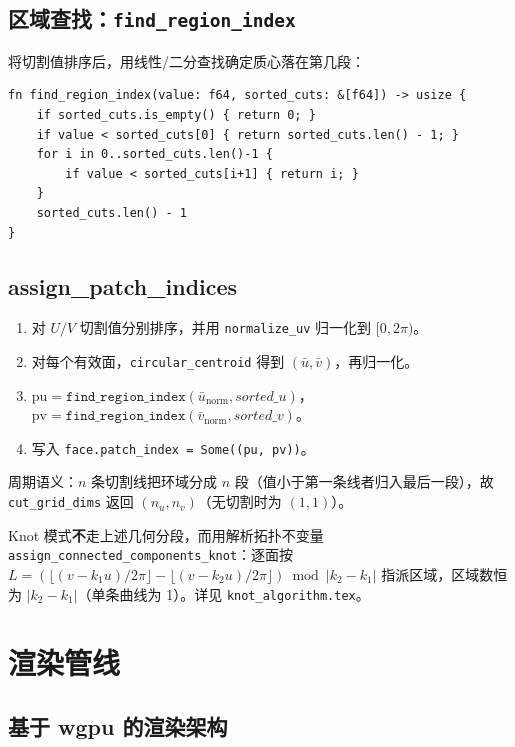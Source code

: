\documentclass[12pt,a4paper]{article}
\begin{document}
\subsection{区域查找：\texttt{find\_region\_index}}

将切割值排序后，用线性/二分查找确定质心落在第几段：
\begin{lstlisting}[]
fn find_region_index(value: f64, sorted_cuts: &[f64]) -> usize {
    if sorted_cuts.is_empty() { return 0; }
    if value < sorted_cuts[0] { return sorted_cuts.len() - 1; }
    for i in 0..sorted_cuts.len()-1 {
        if value < sorted_cuts[i+1] { return i; }
    }
    sorted_cuts.len() - 1
}
\end{lstlisting}

\subsection{assign\_patch\_indices}

\begin{enumerate}
\item 对 $U/V$ 切割值分别排序，并用 \texttt{normalize\_uv} 归一化到 $[0,2\pi)$。
\item 对每个有效面，\texttt{circular\_centroid} 得到 $(\bar u, \bar v)$，再归一化。
\item $\mathrm{pu} = \texttt{find\_region\_index}(\bar u_{\text{norm}}, sorted\_u)$，
  $\mathrm{pv} = \texttt{find\_region\_index}(\bar v_{\text{norm}}, sorted\_v)$。
\item 写入 \texttt{face.patch\_index = Some((pu, pv))}。
\end{enumerate}

周期语义：$n$ 条切割线把环域分成 $n$ 段（值小于第一条线者归入最后一段），故
\texttt{cut\_grid\_dims} 返回 $(n_u, n_v)$（无切割时为 $(1,1)$）。

Knot 模式\textbf{不}走上述几何分段，而用解析拓扑不变量
\texttt{assign\_connected\_components\_knot}：逐面按
$L=(\lfloor(v-k_1u)/2\pi\rfloor-\lfloor(v-k_2u)/2\pi\rfloor)\bmod|k_2-k_1|$
指派区域，区域数恒为 $|k_2-k_1|$（单条曲线为 1）。详见 \texttt{knot\_algorithm.tex}。

\section{渲染管线}

\subsection{基于 wgpu 的渲染架构}
\end{document}
